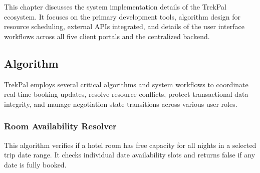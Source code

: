 \documentclass[12pt,a4paper]{article}
\newlength{\ThesisParagraphIndent}
\newcommand{\ThesisParagraph}[1]{%
  \par\begingroup
  \setlength{\leftskip}{\ThesisParagraphIndent}%
  \setlength{\parindent}{0pt}%
  \noindent#1\par
  \endgroup}
\begin{document}
\ThesisParagraph{This chapter discusses the system implementation details of the TrekPal ecosystem. It focuses on the primary development tools, algorithm design for resource scheduling, external APIs integrated, and details of the user interface workflows across all five client portals and the centralized backend.}


\subsection{Algorithm}

\ThesisParagraph{TrekPal employs several critical algorithms and system workflows to coordinate real-time booking updates, resolve resource conflicts, protect transactional data integrity, and manage negotiation state transitions across various user roles.}


\subsubsection{Room Availability Resolver}

\ThesisParagraph{This algorithm verifies if a hotel room has free capacity for all nights in a selected trip date range. It checks individual date availability slots and returns false if any date is fully booked.}
\end{document}
